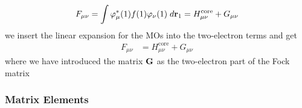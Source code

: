 \documentclass[11pt]{article}
\begin{document}
\begin{equation}\label{eq:fock} 
F_{\mu \nu} = \int \varphi_\mu^*(1)f(1)\varphi_{\nu}(1)\;d\textbf{r}_1 = H_{\mu \nu}^{\text{core}}+G_{\mu \nu}\\ 
\end{equation}
 we insert the linear expansion for the MOs into the two-electron terms and get
\begin{align*}
F_{\mu\nu} &= H_{\mu\nu}^{\text{core}} + G_{\mu \nu}
\end{align*}
where we have introduced the matrix $\textbf{G}$ as the two-electron part of the Fock matrix
\subsubsection{Matrix Elements}
\end{document}
